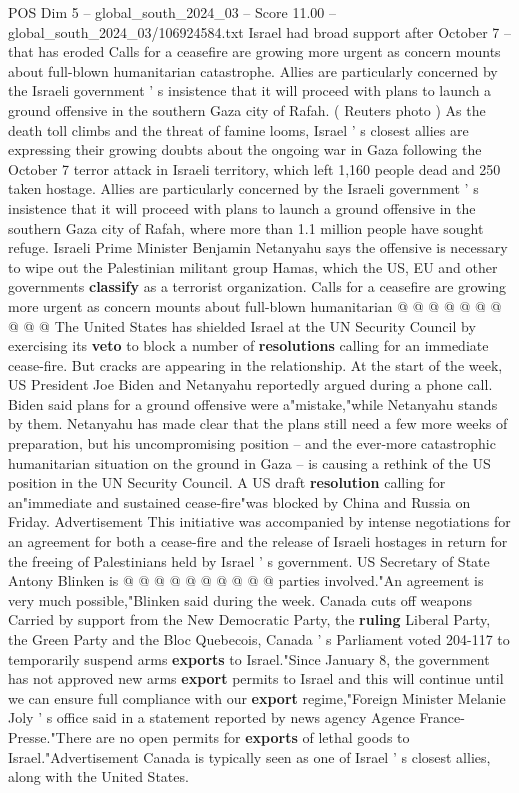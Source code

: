 \begin{textsample}{POS Dim 5 – global\_south\_2024\_03 – Score 11.00 – global\_south\_2024\_03/106924584.txt}  \label{ex:f5_pos_148}
Israel had broad support after October 7 -- that has eroded Calls for a ceasefire are growing more urgent as concern mounts about full-blown humanitarian catastrophe.
Allies are particularly concerned by the Israeli government ' s insistence that it will proceed with plans to launch a ground offensive in the southern Gaza city of Rafah. ( Reuters photo ) As the death toll climbs and the threat of famine looms, Israel ' s closest allies are expressing their growing doubts about the ongoing war in Gaza following the October 7 terror attack in Israeli territory, which left 1,160 people dead and 250 taken hostage.
Allies are particularly concerned by the Israeli government ' s insistence that it will proceed with plans to launch a ground offensive in the southern Gaza city of Rafah, where more than 1.1 million people have sought refuge.
Israeli Prime Minister Benjamin Netanyahu says the offensive is necessary to wipe out the Palestinian militant group Hamas, which the US, EU and other governments \textbf{classify} as a terrorist organization.
Calls for a ceasefire are growing more urgent as concern mounts about full-blown humanitarian @ @ @ @ @ @ @ @ @ @ The United States has shielded Israel at the UN Security Council by exercising its \textbf{veto} to block a number of \textbf{resolutions} calling for an immediate cease-fire.
But cracks are appearing in the relationship.
At the start of the week, US President Joe Biden and Netanyahu reportedly argued during a phone call.
Biden said plans for a ground offensive were a"mistake,"while Netanyahu stands by them.
Netanyahu has made clear that the plans still need a few more weeks of preparation, but his uncompromising position -- and the ever-more catastrophic humanitarian situation on the ground in Gaza -- is causing a rethink of the US position in the UN Security Council.
A US draft \textbf{resolution} calling for an"immediate and sustained cease-fire"was blocked by China and Russia on Friday.
Advertisement This initiative was accompanied by intense negotiations for an agreement for both a cease-fire and the release of Israeli hostages in return for the freeing of Palestinians held by Israel ' s government.
US Secretary of State Antony Blinken is @ @ @ @ @ @ @ @ @ @ parties involved."An agreement is very much possible,"Blinken said during the week.
Canada cuts off weapons Carried by support from the New Democratic Party, the \textbf{ruling} Liberal Party, the Green Party and the Bloc Quebecois, Canada ' s Parliament voted 204-117 to temporarily suspend arms \textbf{exports} to Israel."Since January 8, the government has not approved new arms \textbf{export} permits to Israel and this will continue until we can ensure full compliance with our \textbf{export} regime,"Foreign Minister Melanie Joly ' s office said in a statement reported by news agency Agence France-Presse."There are no open permits for \textbf{exports} of lethal goods to Israel."Advertisement Canada is typically seen as one of Israel ' s closest allies, along with the United States.

\end{textsample}
